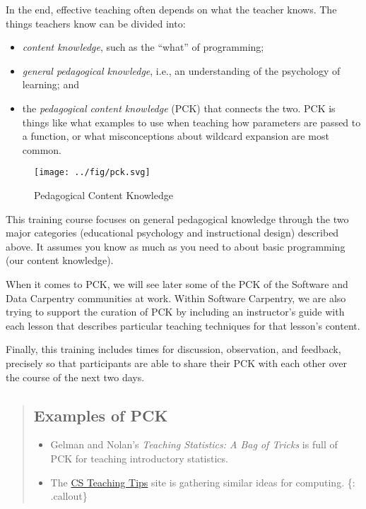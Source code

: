 In the end, effective teaching often depends on what the teacher knows.
The things teachers know can be divided into:

\begin{itemize}
\item
  \emph{content knowledge}, such as the ``what'' of programming;
\item
  \emph{general pedagogical knowledge}, i.e., an understanding of the
  psychology of learning; and
\item
  the \emph{pedagogical content knowledge} (PCK) that connects the two.
  PCK is things like what examples to use when teaching how parameters
  are passed to a function, or what misconceptions about wildcard
  expansion are most common.
\end{itemize}

\begin{figure}[htbp]
\centering
\texttt{[image: ../fig/pck.svg]}
\caption{Pedagogical Content Knowledge}
\end{figure}

This training course focuses on general pedagogical knowledge through
the two major categories (educational psychology and instructional
design) described above. It assumes you know as much as you need to
about basic programming (our content knowledge).

When it comes to PCK, we will see later  some
of the PCK of the Software and Data Carpentry communities at
work. Within Software Carpentry, we are also trying to support the
curation of PCK by including an instructor's guide with each lesson
that describes particular teaching techniques for that lesson's
content.

Finally, this training includes times for discussion, observation, and
feedback, precisely so that participants are able to share their PCK
with each other over the course of the next two days.

\begin{quote}
\subsection{Examples of PCK}\label{examples-of-pck}

\begin{itemize}
\itemsep1pt\parskip0pt
\item
  Gelman and Nolan's
  \textit{Teaching   Statistics: A Bag of Tricks} \cite{bib:gelman-nolan-stats-tricks}
  is full of PCK for teaching introductory statistics.
\item
  The \href{http://csteachingtips.org/}{CS Teaching Tips} site is
  gathering similar ideas for computing. \{: .callout\}
\end{itemize}
\end{quote}

